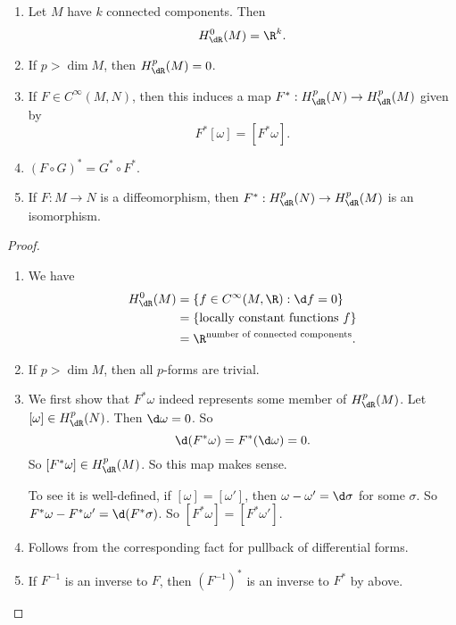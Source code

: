 \documentclass[a4paper]{article}
\begin{document}
\begin{prop}\leavevmode
  \begin{enumerate}
    \item Let $M$ have $k$ connected components. Then
      \[
        H_{\dR}^0(M) = \R^k.
      \]
    \item If $p > \dim M$, then $H^p_{\dR}(M) = 0$.
    \item If $F \in C^\infty(M, N)$, then this induces a map $F^*: H^p_\dR(N) \to H^p_\dR(M)$ given by
      \[
        F^*[\omega] = [F^* \omega].
      \]
    \item $(F \circ G)^* = G^* \circ F^*$.
    \item If $F: M \to N$ is a diffeomorphism, then $F^*: H^p_{\dR}(N) \to H^p_{\dR}(M)$ is an isomorphism. \qedhere
  \end{enumerate}
\end{prop}

\begin{proof}\leavevmode
  \begin{enumerate}
    \item We have
      \begin{align*}
        H_{\dR}^0(M) &= \{f \in C^\infty(M, \R): \d f = 0\} \\
        &= \{\text{locally constant functions $f$}\}\\
        &= \R^{\text{number of connected components}}.
      \end{align*}
    \item If $p > \dim M$, then all $p$-forms are trivial.
    \item We first show that $F^* \omega$ indeed represents some member of $H^p_{\dR}(M)$. Let $[\omega] \in H^p_{\dR}(N)$. Then $\d \omega = 0$. So
      \[
        \d (F^* \omega) = F^*(\d \omega) = 0.
      \]
      So $[F^* \omega] \in H^p_\dR(M)$. So this map makes sense.

      To see it is well-defined, if $[\omega] = [\omega']$, then $\omega - \omega' = \d \sigma$ for some $\sigma$. So $F^* \omega - F^* \omega' = \d (F^* \sigma)$. So $[F^* \omega] = [F^* \omega']$.
    \item Follows from the corresponding fact for pullback of differential forms.
    \item If $F^{-1}$ is an inverse to $F$, then $(F^{-1})^*$ is an inverse to $F^*$ by above.
  \end{enumerate}
\end{proof}
\end{document}
